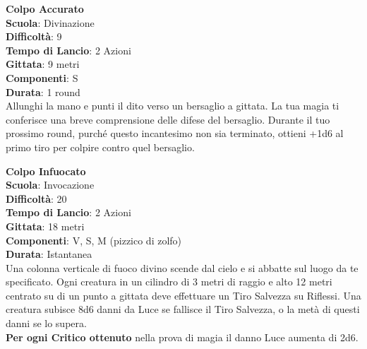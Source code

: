 \begin{multicols}{2}
\medskip\textbf{Colpo Accurato}\\
\textbf{Scuola}: Divinazione\\
\textbf{Difficoltà}: 9\\
\textbf{Tempo di Lancio}: 2 Azioni\\
\textbf{Gittata}: 9 metri\\
\textbf{Componenti}: S\\
\textbf{Durata}: 1 round\\
Allunghi la mano e punti il dito verso un bersaglio a gittata. La tua magia ti conferisce una breve comprensione delle difese del bersaglio. Durante il tuo prossimo round, purché questo incantesimo non sia terminato, ottieni +1d6 al primo tiro per colpire contro quel bersaglio.

\medskip\textbf{Colpo Infuocato}\\
\textbf{Scuola}: Invocazione\\
\textbf{Difficoltà}: 20\\
\textbf{Tempo di Lancio}: 2 Azioni\\
\textbf{Gittata}: 18 metri\\
\textbf{Componenti}: V, S, M (pizzico di zolfo)\\
\textbf{Durata}: Istantanea\\
Una colonna verticale di fuoco divino scende dal cielo e si abbatte sul luogo da te specificato. Ogni creatura in un cilindro di 3 metri di raggio e alto 12 metri centrato su di un punto a gittata deve effettuare un Tiro Salvezza su Riflessi. Una creatura subisce 8d6 danni da Luce se fallisce il Tiro Salvezza, o la metà di questi danni se lo supera.\\
\textbf{Per ogni Critico ottenuto} nella prova di magia il danno Luce aumenta di 2d6.


\end{multicols}
